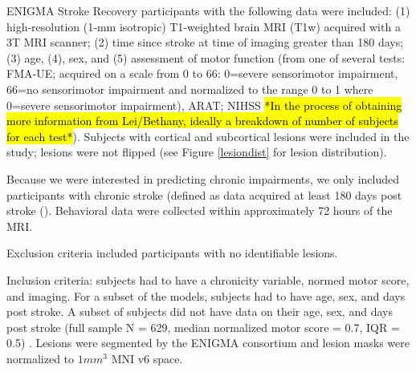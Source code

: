 \documentclass[10pt]{article}
\begin{document}
ENIGMA Stroke Recovery participants with the following data were included: (1) high‐resolution (1‐mm isotropic) T1‐weighted brain MRI (T1w) acquired with a 3T MRI scanner; (2) time since stroke at time of imaging greater than 180 days; (3) age, (4), sex, and (5) assessment of motor function (from one of several tests: FMA‐UE; acquired on a scale from 0 to 66: 0=severe sensorimotor impairment, 66=no sensorimotor impairment and normalized to the range 0 to 1 where 0=severe sensorimotor impairment), ARAT; NIHSS \hl{*In the process of obtaining more information from Lei/Bethany, ideally a breakdown of number of subjects for each test*}). Subjects with cortical and subcortical lesions were included in the study; lesions were not flipped (see Figure \ref{lesiondist} for lesion distribution).



Because we were interested in predicting chronic impairments, we only included participants with chronic stroke (defined as data acquired at least 180 days post stroke (\cite{Bernhardt2017-av}). Behavioral data were collected within approximately 72 hours of the MRI. 


Exclusion criteria included participants with no identifiable lesions. 

Inclusion criteria: subjects had to have a chronicity variable, normed motor score, and imaging.
For a subset of the models, subjects had to have age, sex, and days post stroke. A subset of subjects did not have data on their age, sex, and days post stroke (full sample N = 629, median normalized motor score = 0.7, IQR = 0.5) .
Lesions were segmented by the ENIGMA consortium and lesion masks were normalized to $1mm^3$ MNI v6 space. 
\end{document}
